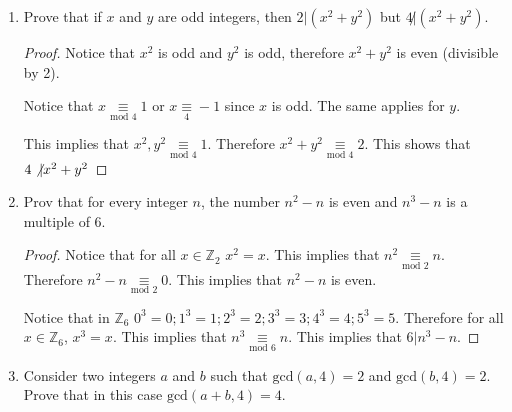 \documentclass[12pt]{article}
\begin{document}
\begin{enumerate}
\begin{enumerate}
\begin{proof}
                Notice that $min(p,q) + max(p,q) = p+q$ for any  $p,q \in \mathbb Z$. Therefore $\textrm{gcd}(a,b) \cdot \textrm{lcm}(a,b) = a \cdot b$ .
                
                Since $\textrm{gcd}(a,b) = 1$, then $\textrm{lcm}(a,b) = a \cdot b$. Notice that $c$ is a common multiple for $a$ and $b$. Therefore $a \cdot b = \textrm{gcd}(a,b) | c$
                \end{proof}
        \end{enumerate}
        
        \item Prove that if $x$ and $y$ are odd integers, then $2 | (x^2 +y^2)$ but $4 \not | (x^2 + y^2)$.
        
            \begin{proof}
                Notice that $x^2$ is odd and $y^2$ is odd, therefore $x^2 + y^2$ is even (divisible by 2).
                
                Notice that $x  \underset{\textrm{mod }4}{\equiv} 1 $ or $x  \underset{4}{\equiv} -1 $ since $x$ is odd. The same applies for $y$.
                
                This implies that $x^2, y^2 \underset{\textrm{mod }4}{\equiv} 1$. Therefore $x^2 + y^2 \underset{\textrm{mod }4}{\equiv} 2$. This shows that $4 \not\vert{x^2+y^2}$
            \end{proof}
            
            \item Prov that for every integer $n$, the number $n^2-n$ is even and $n^3-n$ is a multiple of 6.
            
            \begin{proof}
                Notice that for all $x \in \mathbb Z_2$ $x^2 = x$. This implies that $n^2 \underset{\textrm{mod } 2}{\equiv} n$. Therefore $n^2-n \underset{\textrm{mod }2}{\equiv} 0$. This implies that $n^2-n$ is even.
                
                Notice that in $\mathbb Z_6$ $0 ^3 = 0; 1^3 = 1; 2^3 = 2; 3^3 = 3; 4^3 = 4; 5^3 = 5$. Therefore for all $x \in \mathbb Z_6$, $x^3 = x$. This implies that $n^3 \underset{\textrm{mod }6}{\equiv} n$. This implies that $6 | n^3 -n$.
            \end{proof}
            
            \item Consider two integers $a$ and $b$ such that $\textrm{gcd}(a,4) = 2$ and $\textrm{gcd}(b,4) = 2$. Prove that in this case $\textrm{gcd}(a+b,4)=4$.
            

\end{enumerate}
\end{document}
